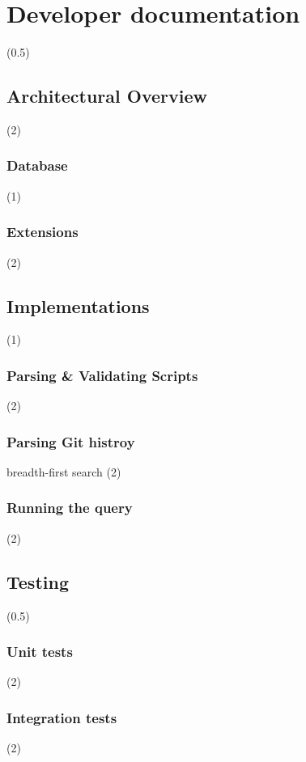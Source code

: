 \chapter{Developer documentation}
\label{ch:impl}

(0.5)

\section{Architectural Overview}

(2)

\subsection{Database}

(1)

\subsection{Extensions}

(2)

\section{Implementations}

(1)

\subsection{Parsing & Validating Scripts}

(2)

\subsection{Parsing Git histroy}

breadth-first search (2)

\subsection{Running the query}

(2)

\section{Testing}

(0.5)

\subsection{Unit tests}

(2)

\subsection{Integration tests}

(2)